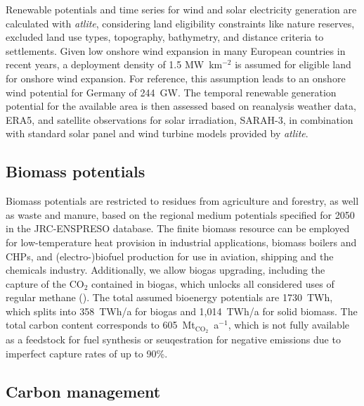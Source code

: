 Renewable potentials and time series for wind and solar electricity generation
are calculated with \textit{atlite},\cite{hofmannAtliteLightweight2021}
considering land eligibility constraints like nature reserves, excluded land use
types, topography, bathymetry, and distance criteria to settlements. Given low
onshore wind expansion in many European countries in recent
years,\cite{ourworldindataInstalledWind2023} a deployment density of 1.5
MW~km$^{-2}$ is assumed for eligible land for onshore wind
expansion.\cite{turkovskaLanduseRequirementsSolar2023a} For reference, this
assumption leads to an onshore wind potential for Germany of 244~GW. The
temporal renewable generation potential for the available area is then assessed
based on reanalysis weather data, ERA5,\cite{ecmwf} and satellite observations
for solar irradiation, SARAH-3,\cite{pfeifrothSurfaceRadiationData2023} in
combination with standard solar panel and wind turbine models provided by
\textit{atlite}.

\subsection*{Biomass potentials}

Biomass potentials are restricted to residues from agriculture and forestry, as
well as waste and manure, based on the regional medium potentials specified for
2050 in the JRC-ENSPRESO database.\cite{ruizENSPRESOOpen2019} The finite biomass
resource can be employed for low-temperature heat provision in industrial
applications, biomass boilers and CHPs, and (electro-)biofuel production for use
in aviation, shipping and the chemicals industry. Additionally, we allow biogas
upgrading, including the capture of the CO$_2$ contained in biogas, which
unlocks all considered uses of regular methane
(). The total assumed bioenergy
potentials are 1730~TWh, which splits into 358~TWh/a for biogas and 1,014~TWh/a
for solid biomass. The total carbon content corresponds to
605~Mt$_{\text{CO}_2}$~a$^{-1}$, which is not fully available as a feedstock for
fuel synthesis or seuqestration for negative emissions due to imperfect capture
rates of up to 90\%.

\subsection*{Carbon management}

